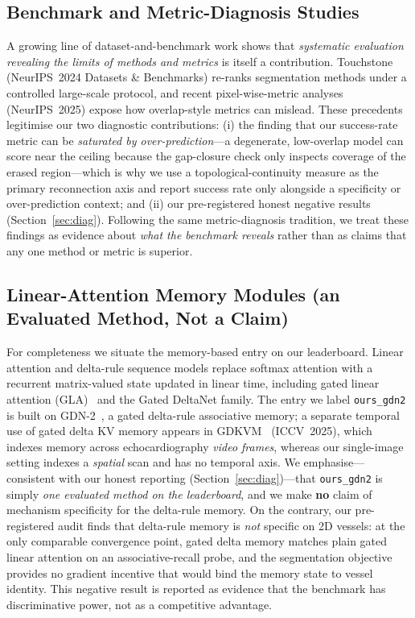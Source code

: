 \subsection{Benchmark and Metric-Diagnosis Studies}
\label{sec:related:diag}

A growing line of dataset-and-benchmark work shows that \emph{systematic
evaluation revealing the limits of methods and metrics} is itself a contribution.
Touchstone~\cite{key:touchstone} (NeurIPS~2024 Datasets \& Benchmarks) re-ranks
segmentation methods under a controlled large-scale protocol, and recent
pixel-wise-metric analyses~\cite{key:pixelwise} (NeurIPS~2025) expose how
overlap-style metrics can mislead. These precedents legitimise our two
diagnostic contributions: (i) the finding that our success-rate metric can be
\emph{saturated by over-prediction}---a degenerate, low-overlap model can score
near the ceiling because the gap-closure check only inspects coverage of the
erased region---which is why we use a topological-continuity measure as the
primary reconnection axis and report success rate only alongside a specificity or
over-prediction context; and (ii) our pre-registered honest negative results
(Section~\ref{sec:diag}). Following the same metric-diagnosis tradition, we treat
these findings as evidence about \emph{what the benchmark reveals} rather than as
claims that any one method or metric is superior.

\subsection{Linear-Attention Memory Modules (an Evaluated Method, Not a Claim)}
\label{sec:related:memory}

For completeness we situate the memory-based entry on our leaderboard. Linear
attention and delta-rule sequence models replace softmax attention with a
recurrent matrix-valued state updated in linear time, including gated linear
attention (GLA)~\cite{key:gla} and the Gated DeltaNet family. The entry we label
\texttt{ours\_gdn2} is built on GDN-2~\cite{key:gdn2}, a gated delta-rule
associative memory; a separate temporal use of gated delta KV memory appears in
GDKVM~\cite{key:gdkvm} (ICCV~2025), which indexes memory across echocardiography
\emph{video frames}, whereas our single-image setting indexes a \emph{spatial}
scan and has no temporal axis. We emphasise---consistent with our honest
reporting (Section~\ref{sec:diag})---that \texttt{ours\_gdn2} is simply
\emph{one evaluated method on the leaderboard}, and we make \textbf{no} claim of
mechanism specificity for the delta-rule memory. On the contrary, our
pre-registered audit finds that delta-rule memory is \emph{not} specific on 2D
vessels: at the only comparable convergence point, gated delta memory matches
plain gated linear attention on an associative-recall probe, and the
segmentation objective provides no gradient incentive that would bind the memory
state to vessel identity. This negative result is reported as evidence that the
benchmark has discriminative power, not as a competitive advantage.
